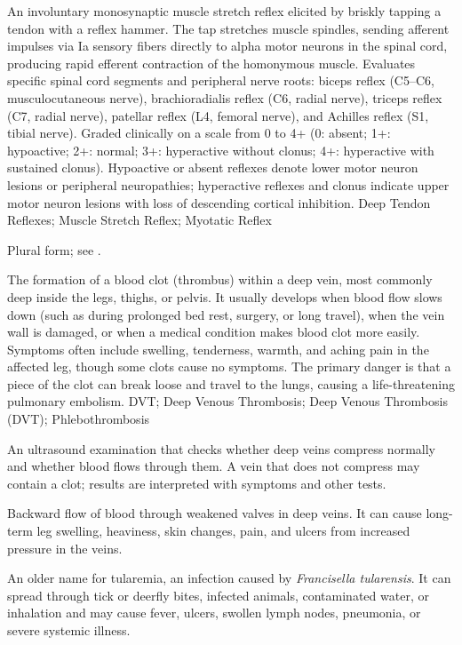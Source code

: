  An involuntary monosynaptic muscle stretch reflex elicited by briskly tapping a tendon with a reflex hammer. The tap stretches muscle spindles, sending afferent impulses via Ia sensory fibers directly to alpha motor neurons in the spinal cord, producing rapid efferent contraction of the homonymous muscle. Evaluates specific spinal cord segments and peripheral nerve roots: biceps reflex (C5--C6, musculocutaneous nerve), brachioradialis reflex (C6, radial nerve), triceps reflex (C7, radial nerve), patellar reflex (L4, femoral nerve), and Achilles reflex (S1, tibial nerve). Graded clinically on a scale from 0 to 4+ (0: absent; 1+: hypoactive; 2+: normal; 3+: hyperactive without clonus; 4+: hyperactive with sustained clonus). Hypoactive or absent reflexes denote lower motor neuron lesions or peripheral neuropathies; hyperactive reflexes and clonus indicate upper motor neuron lesions with loss of descending cortical inhibition.
\synonyms
Deep Tendon Reflexes; Muscle Stretch Reflex; Myotatic Reflex

 Plural form; see .

 The formation of a blood clot (thrombus) within a deep vein, most commonly deep inside the legs, thighs, or pelvis. It usually develops when blood flow slows down (such as during prolonged bed rest, surgery, or long travel), when the vein wall is damaged, or when a medical condition makes blood clot more easily. Symptoms often include swelling, tenderness, warmth, and aching pain in the affected leg, though some clots cause no symptoms. The primary danger is that a piece of the clot can break loose and travel to the lungs, causing a life-threatening pulmonary embolism.
\synonyms
DVT; Deep Venous Thrombosis; Deep Venous Thrombosis (DVT); Phlebothrombosis

 An ultrasound examination that checks whether deep veins compress normally and whether blood flows through them. A vein that does not compress may contain a clot; results are interpreted with symptoms and other tests.

 Backward flow of blood through weakened valves in deep veins. It can cause long-term leg swelling, heaviness, skin changes, pain, and ulcers from increased pressure in the veins.

 An older name for tularemia, an infection caused by \textit{Francisella tularensis}. It can spread through tick or deerfly bites, infected animals, contaminated water, or inhalation and may cause fever, ulcers, swollen lymph nodes, pneumonia, or severe systemic illness.

